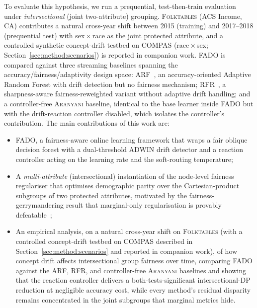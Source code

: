 \documentclass[sigconf,anonymous,review]{acmart}
\begin{document}
To evaluate this hypothesis, we run a prequential, test-then-train evaluation under \emph{intersectional} (joint two-attribute) grouping. \textsc{Folktables} (ACS Income, CA)
contributes a natural cross-year shift between 2015 (training) and 2017--2018 (prequential test) with sex\,$\times$\,race as the joint protected attribute, and a controlled
synthetic concept-drift testbed on \textsc{COMPAS} (race\,$\times$\,sex; Section~\ref{sec:method:scenarios}) is reported in companion work. \textsc{FADO} is compared against
three streaming baselines spanning the accuracy/fairness/adaptivity design space: \textsc{ARF}~\cite{10.1007/s10994-017-5642-8}, an accuracy-oriented Adaptive Random Forest with
drift detection but no fairness mechanism; \textsc{RFR}~\cite{jiang2023chasingfairnessdistributionshift}, a sharpness-aware fairness-reweighted variant without adaptive drift
handling; and a controller-free \textsc{Aranyani} baseline, identical to the base learner inside \textsc{FADO} but with the drift-reaction controller disabled, which isolates the
controller's contribution. The main contributions of this work are:
\begin{itemize}
\item \textsc{FADO}, a fairness-aware online learning framework that wraps a fair oblique decision forest with a dual-threshold ADWIN drift detector and a reaction controller acting on the learning rate and the soft-routing temperature;
\item A \emph{multi-attribute} (intersectional) instantiation of the node-level fairness regulariser that optimises demographic parity over the Cartesian-product subgroups of two protected attributes, motivated by the fairness-gerrymandering result that marginal-only regularisation is provably defeatable~\cite{kearns2018gerrymandering};
\item An empirical analysis, on a natural cross-year shift on \textsc{Folktables} (with a controlled concept-drift testbed on \textsc{COMPAS} described in Section~\ref{sec:method:scenarios} and reported in companion work), of how concept drift affects intersectional group fairness over time, comparing \textsc{FADO} against the \textsc{ARF}, \textsc{RFR}, and controller-free \textsc{Aranyani} baselines and showing that the reaction controller delivers a both-tests-significant intersectional-DP reduction at negligible accuracy cost, while every method's residual disparity remains concentrated in the joint subgroups that marginal metrics hide.
\end{itemize}
\end{document}
